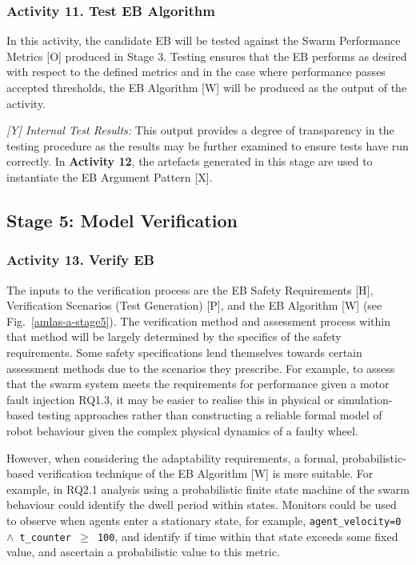 \documentclass[runningheads]{llncs}
\begin{document}
\subsubsection*{Activity 11. Test EB Algorithm}

In this activity, the candidate EB will be tested against the Swarm Performance Metrics [O] produced in Stage 3. Testing ensures that the EB performs as desired with respect to the defined metrics and in the case where performance passes accepted thresholds, the EB Algorithm [W] will be produced as the output of the activity. 

\emph{[Y] Internal Test Results:} This output provides a degree of transparency in the testing procedure as the results may be further examined to ensure tests have run correctly. 
In \textbf{Activity 12}, the artefacts generated in this stage are used to instantiate the EB Argument Pattern [X].

\subsection{Stage 5: Model Verification} \label{framework-stage5}
\subsubsection*{Activity 13. Verify EB}
The inputs to the verification process are the EB Safety Requirements [H], Verification Scenarios (Test Generation) [P], and the EB Algorithm [W] (see Fig.~\ref{amlas-a-stage5}). 
%
The verification method and assessment process within that method will be largely determined by the specifics of the safety requirements. Some safety specifications lend themselves towards certain assessment methods due to the scenarios they prescribe.
%
For example, to assess that the swarm system meets the requirements for performance given a motor fault injection RQ1.3, it may be easier to realise this in physical or simulation-based testing approaches rather than constructing a reliable formal model of robot behaviour given the complex physical dynamics of a faulty wheel.

%
However, when considering the adaptability requirements, a formal, probabilistic-based verification technique of the EB Algorithm [W] is more suitable. For example, in RQ2.1 analysis using a probabilistic finite state machine of the swarm behaviour could identify the dwell period within states. Monitors could be used to observe when agents enter a stationary state, for example, \texttt{agent\_velocity=0 $\land $  t\_counter  $\ge$ 100}, and identify if time within that state exceeds some fixed value, and ascertain a probabilistic value to this metric.
\end{document}
